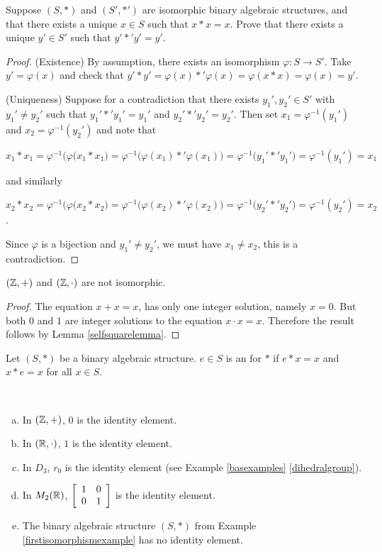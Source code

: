 \documentclass[11pt,fleqn,dvipsnames,usenames]{article}
\newcommand{\p}{\noindent}
\begin{document}
%
\begin{lemma}\label{selfsquarelemma}
Suppose $(S,*)$ and $(S',*')$ are isomorphic binary algebraic structures, and that there exists a unique $x\in S$ such that $x*x = x$.  Prove that there exists a unique $y'\in S'$ such that $y'*'y' = y'$.
\end{lemma}
%
\begin{proof}\phantom{-}

\p (Existence) By assumption, there exists an isomorphism $\varphi:S\to S'$.  Take $y' = \varphi(x)$ and check that $y'*y' = \varphi(x)*'\varphi(x) = \varphi(x*x) = \varphi(x) = y'$.
\vsp

\p (Uniqueness) Suppose for a contradiction that there exists $y_{1}',y_{2}'\in S'$ with $y_{1}'\neq y_{2}'$ such that $y_{1}'*'y_{1}' = y_{1}'$ and $y_{2}'*'y_{2}' = y_{2}'$.  Then set $x_{1} = \varphi^{-1}(y_{1}')$ and $x_{2} = \varphi^{-1}(y_{2}')$ and note that
\begin{center}
$x_{1}*x_{1} = \varphi^{-1}\big(\varphi(x_1*x_1\big) = \varphi^{-1}\big(\varphi(x_1)*'\varphi(x_1)\big) = \varphi^{-1}\big(y_{1}'*'y_{1}'\big) = \varphi^{-1}(y_{1}') = x_{1}$
\end{center}
and similarly
\begin{center}
$x_{2}*x_{2} = \varphi^{-1}\big(\varphi(x_2*x_2\big) = \varphi^{-1}\big(\varphi(x_2)*'\varphi(x_2)\big) = \varphi^{-1}\big(y_{2}'*'y_{2}'\big) = \varphi^{-1}(y_{2}') = x_{2}$.
\end{center}
Since $\varphi$ is a bijection and $y_{1}'\neq y_{2}'$, we must have $x_{1}\neq x_{2}$, this is a contradiction.
\end{proof}
%
\begin{theorem}
$(\Z,+)$ and $(\Z,\cdot)$ are not isomorphic.
\end{theorem}
%
\begin{proof}
The equation $x + x = x$, has only one integer solution, namely $x = 0$.  But both $0$ and $1$ are integer solutions to the equation $x\cdot x = x$.  Therefore the result follows by Lemma \ref{selfsquarelemma}.
\end{proof}
%
\begin{definition}
Let $(S,*)$ be a binary algebraic structure.  $e\in S$ is an  for $*$ if $e*x = x$ and $x*e = x$ for all $x\in S$.
\end{definition}
%
\begin{examples}~
\begin{enumerate}[(a)]
\item In $(\Z,+)$, $0$ is the identity element.
\item In $(\REAL,\cdot)$, $1$ is the identity element.
\item In $D_3$, $r_{0}$ is the identity element (see Example \ref{basexamples} \ref{dihedralgroup}).
\item In $M_{2}(\REAL)$, $\MATRIX{rr}{1 & 0\\0 & 1}$ is the identity element.
\item The binary algebraic structure $(S,*)$ from Example \ref{firstisomorphismexample} has no identity element.
\end{enumerate}
\end{examples}
\end{document}
